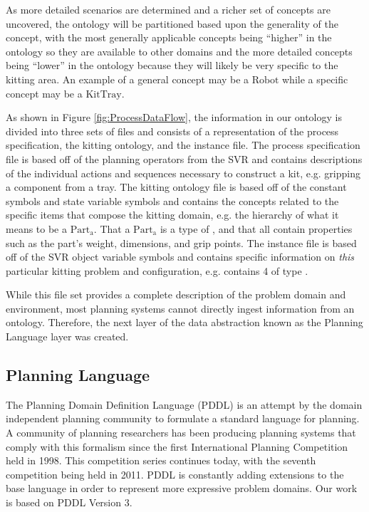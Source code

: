 As more detailed scenarios are determined and a richer set of concepts are uncovered, the ontology will be partitioned based upon the generality of the concept, with the most generally applicable concepts being ``higher'' in the ontology so they are available to other domains and the more detailed concepts being ``lower'' in the ontology because they will likely be very specific to the kitting area. An example of a general concept may be a $\mathrm{Robot}$ while a specific concept may be a $\mathrm{KitTray}$.

As shown in Figure \ref{fig:ProcessDataFlow}, the information in our ontology is divided into three sets of files and consists of a representation of the process specification,
the kitting ontology, and the instance file. The process specification file is based off of the planning operators from the SVR and contains descriptions of
the individual actions and sequences necessary to construct a kit, e.g. gripping a component from a tray. The kitting ontology file is based off of the constant symbols and
state variable symbols and contains the concepts related to the specific items
that compose the kitting domain, e.g. the hierarchy of what it means to be a $\mathrm{Part_a}$. That a $\mathrm{Part_a}$ is a type of , and that
all  contain properties such as the part's weight, dimensions, and grip points. The instance file is based off of the SVR object variable symbols and
contains specific information on {\it this} particular kitting problem and configuration, e.g.   contains 4  of type .

While this file set provides a complete description of the problem domain and environment, most planning systems cannot directly ingest information from an ontology.
Therefore, the next layer of the data abstraction known as the Planning Language layer was created.

\subsection{Planning Language}
The Planning Domain Definition Language (PDDL) \cite{PDDL} is an attempt by the domain independent planning community to formulate a standard language for planning. A community
of planning researchers has been producing planning systems that comply with this formalism since the first International Planning Competition held in 1998. This competition series
continues today, with the seventh competition being held in 2011. PDDL is constantly adding extensions to the base language in order to represent more expressive problem domains. Our
work is based on PDDL Version  3.

